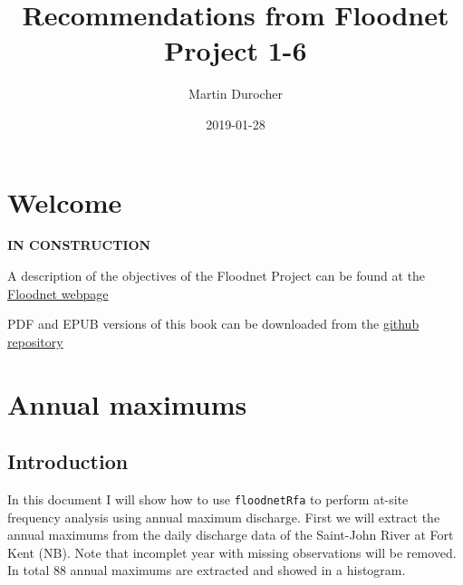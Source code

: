 \documentclass[]{book}
\title{Recommendations from Floodnet Project 1-6}
\author{Martin Durocher}
\date{2019-01-28}
\newenvironment{Shaded}{\begin{snugshade}}{\end{snugshade}}
\newcommand{\DataTypeTok}[1]{\textcolor[rgb]{0.13,0.29,0.53}{#1}}
\newcommand{\DecValTok}[1]{\textcolor[rgb]{0.00,0.00,0.81}{#1}}
\newcommand{\KeywordTok}[1]{\textcolor[rgb]{0.13,0.29,0.53}{\textbf{#1}}}
\newcommand{\NormalTok}[1]{#1}
\newcommand{\OperatorTok}[1]{\textcolor[rgb]{0.81,0.36,0.00}{\textbf{#1}}}
\newcommand{\OtherTok}[1]{\textcolor[rgb]{0.56,0.35,0.01}{#1}}
\newcommand{\StringTok}[1]{\textcolor[rgb]{0.31,0.60,0.02}{#1}}
\theoremstyle{definition}
\theoremstyle{definition}
\theoremstyle{definition}
\theoremstyle{remark}
\begin{document}
\maketitle

{
\setcounter{tocdepth}{1}
\tableofcontents
}
\hypertarget{welcome}{%
\chapter{Welcome}\label{welcome}}

\textbf{IN CONSTRUCTION}

A description of the objectives of the Floodnet Project can be found at
the \href{http://www.nsercfloodnet.ca/}{Floodnet webpage}

PDF and EPUB versions of this book can be downloaded from the
\href{https://github.com/floodnetProject16/recommendations/tree/master/docs}{github
repository}

\hypertarget{amax}{%
\chapter{Annual maximums}\label{amax}}

\hypertarget{introduction}{%
\section{Introduction}\label{introduction}}

In this document I will show how to use \texttt{floodnetRfa} to perform
at-site frequency analysis using annual maximum discharge. First we will
extract the annual maximums from the daily discharge data of the
Saint-John River at Fort Kent (NB). Note that incomplet year with
missing observations will be removed. In total 88 annual maximums are
extracted and showed in a histogram.

\begin{Shaded}
\end{Shaded}
\end{document}
